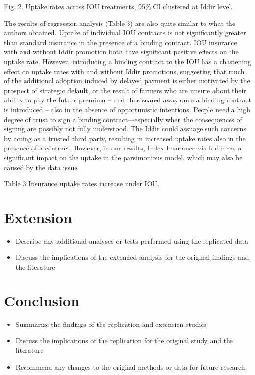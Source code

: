 \documentclass[AER]{AEA}
\begin{document}
Fig. 2. Uptake rates across IOU treatments, 95\% CI clustered at Iddir
level.

The results of regression analysis (Table 3) are also quite similar to
what the authors obtained. Uptake of individual IOU contracts is not
significantly greater than standard insurance in the presence of a
binding contract. IOU insurance with and without Iddir promotion both
have significant positive effects on the uptake rate. However,
introducing a binding contract to the IOU has a chastening effect on
uptake rates with and without Iddir promotions, suggesting that much of
the additional adoption induced by delayed payment is either motivated
by the prospect of strategic default, or the result of farmers who are
unsure about their ability to pay the future premium -- and thus scared
away once a binding contract is introduced -- also in the absence of
opportunistic intentions. People need a high degree of trust to sign a
binding contract---especially when the consequences of signing are
possibly not fully understood. The Iddir could assuage such concerns by
acting as a trusted third party, resulting in increased uptake rates
also in the presence of a contract. However, in our results, Index
Insurance via Iddir has a significant impact on the uptake in the
parsimonious model, which may also be caused by the data issue.

Table 3 Insurance uptake rates increase under IOU.

\section{Extension}

\begin{itemize}

\item Describe any additional analyses or tests performed using the replicated data

\item Discuss the implications of the extended analysis for the original findings and the literature

\end{itemize}

\section{Conclusion}

\begin{itemize}

\item Summarize the findings of the replication and extension studies

\item Discuss the implications of the replication for the original study and the literature

\item Recommend any changes to the original methods or data for future research

\end{itemize}
\end{document}
